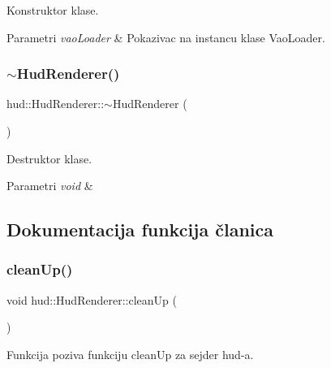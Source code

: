 Konstruktor klase. 


\begin{DoxyParams}{Parametri}
{\em vao\+Loader} & Pokazivac na instancu klase Vao\+Loader. \\
\hline
\end{DoxyParams}
\mbox{\label{classhud_1_1HudRenderer_abe526b3d520a64670efa3d3aaa986d52}} 
\subsubsection{\texorpdfstring{$\sim$\+Hud\+Renderer()}{~HudRenderer()}}
{\footnotesize\ttfamily hud\+::\+Hud\+Renderer\+::$\sim$\+Hud\+Renderer (\begin{DoxyParamCaption}{ }\end{DoxyParamCaption})}



Destruktor klase. 


\begin{DoxyParams}{Parametri}
{\em void} & \\
\hline
\end{DoxyParams}


\subsection{Dokumentacija funkcija članica}
\mbox{\label{classhud_1_1HudRenderer_a17ec594190149eee1db61bed6034daae}} 
\subsubsection{\texorpdfstring{clean\+Up()}{cleanUp()}}
{\footnotesize\ttfamily void hud\+::\+Hud\+Renderer\+::clean\+Up (\begin{DoxyParamCaption}\item[{void}]{ }\end{DoxyParamCaption})}



Funkcija poziva funkciju clean\+Up za sejder hud-\/a. 


